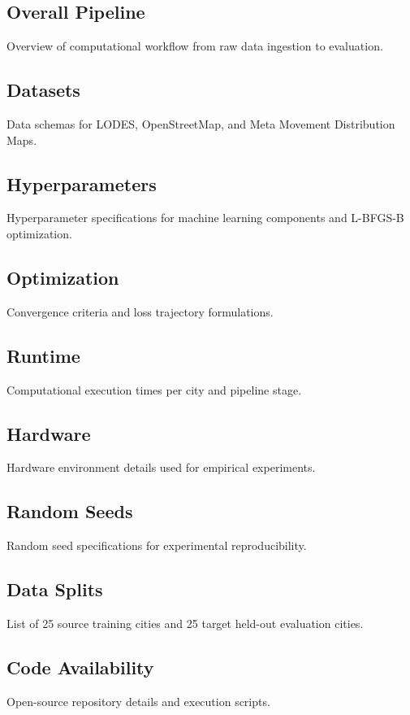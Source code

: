 \documentclass[pdflatex,sn-basic,iicol]{sn-jnl}
\begin{document}
\begin{appendices}
\subsection{Overall Pipeline}
Overview of computational workflow from raw data ingestion to evaluation.

\subsection{Datasets}
Data schemas for LODES, OpenStreetMap, and Meta Movement Distribution Maps.

\subsection{Hyperparameters}
Hyperparameter specifications for machine learning components and L-BFGS-B optimization.

\subsection{Optimization}
Convergence criteria and loss trajectory formulations.

\subsection{Runtime}
Computational execution times per city and pipeline stage.

\subsection{Hardware}
Hardware environment details used for empirical experiments.

\subsection{Random Seeds}
Random seed specifications for experimental reproducibility.

\subsection{Data Splits}
List of 25 source training cities and 25 target held-out evaluation cities.

\subsection{Code Availability}
Open-source repository details and execution scripts.


\end{appendices}
\end{document}
